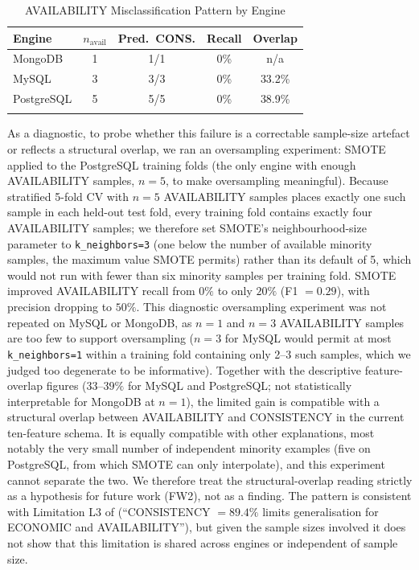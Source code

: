 \documentclass[iicol,pdflatex,sn-mathphys-num]{sn-jnl}
\theoremstyle{thmstyleone}
\theoremstyle{thmstylethree}
\begin{document}
\begin{table}[h]
\caption{AVAILABILITY Misclassification Pattern by Engine}\label{tab:confusion-availability}
\setlength{\tabcolsep}{3.5pt}
\begin{tabular}{@{}lcccc@{}}
\toprule
Engine & $n_{\text{avail}}$ & Pred.\ CONS. & Recall & Overlap\footnotemark[2] \\
\midrule
MongoDB     & 1 & 1/1 & 0\% & n/a\footnotemark[3] \\
MySQL       & 3 & 3/3 & 0\% & 33.2\% \\
PostgreSQL  & 5 & 5/5 & 0\% & 38.9\% \\
\botrule
\end{tabular}
\end{table}

As a diagnostic, to probe whether this failure is a correctable
sample-size artefact or reflects a structural overlap, we ran an
oversampling experiment: SMOTE applied to the PostgreSQL
training folds (the only engine with enough AVAILABILITY samples,
$n=5$, to make oversampling meaningful). Because stratified 5-fold CV
with $n=5$ AVAILABILITY samples places exactly one such sample in each
held-out test fold, every training fold contains exactly four
AVAILABILITY samples; we therefore set SMOTE's neighbourhood-size
parameter to \texttt{k\_neighbors=3} (one below the number of
available minority
samples, the maximum value SMOTE permits) rather than its default of
5, which would not run with fewer than six minority samples per
training fold. SMOTE improved AVAILABILITY
recall from $0\%$ to only $20\%$ (F1 $=0.29$), with precision dropping
to $50\%$. This diagnostic oversampling experiment was not repeated on MySQL or MongoDB, as
$n=1$ and $n=3$ AVAILABILITY samples are too few to support
oversampling ($n=3$ for MySQL would permit at most
\texttt{k\_neighbors=1} within a training fold containing only
2--3 such samples, which we judged too degenerate to be informative).
Together with the descriptive feature-overlap figures
($33$--$39\%$ for MySQL and PostgreSQL; not statistically interpretable
for MongoDB at $n=1$), the limited gain is compatible with a structural
overlap between AVAILABILITY and CONSISTENCY in the current ten-feature
schema. It is equally compatible with other explanations, most notably
the very small number of independent minority examples (five on
PostgreSQL, from which SMOTE can only interpolate), and this experiment
cannot separate the two. We therefore treat the structural-overlap
reading strictly as a hypothesis for future work (FW2), not as a
finding. The pattern is consistent with Limitation L3 of
\cite{iaha2026} (``CONSISTENCY $=89.4\%$ limits generalisation for
ECONOMIC and AVAILABILITY''), but given the sample sizes involved it
does not show that this limitation is shared across engines or
independent of sample size.
\end{document}
